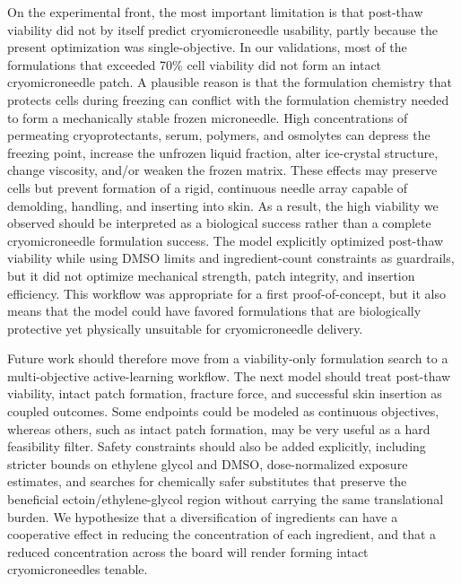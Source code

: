 \documentclass[11pt]{article}
\begin{document}
On the experimental front, the most important limitation is that post-thaw viability did not by itself predict cryomicroneedle usability, partly because the present optimization was single-objective. In our validations, most of the formulations that exceeded 70\% cell viability did not form an intact cryomicroneedle patch. A plausible reason is that the formulation chemistry that protects cells during freezing can conflict with the formulation chemistry needed to form a mechanically stable frozen microneedle. High concentrations of permeating cryoprotectants, serum, polymers, and osmolytes can depress the freezing point, increase the unfrozen liquid fraction, alter ice-crystal structure, change viscosity, and/or weaken the frozen matrix. These effects may preserve cells but prevent formation of a rigid, continuous needle array capable of demolding, handling, and inserting into skin. As a result, the high viability we observed should be interpreted as a biological success rather than a complete cryomicroneedle formulation success. The model explicitly optimized post-thaw viability while using DMSO limits and ingredient-count constraints as guardrails, but it did not optimize mechanical strength, patch integrity, and insertion efficiency. This workflow was appropriate for a first proof-of-concept, but it also means that the model could have favored formulations that are biologically protective yet physically unsuitable for cryomicroneedle delivery.\cite{whaley_overview_2021,murray_chemical_2022,chang_cryomicroneedles_2021}

Future work should therefore move from a viability-only formulation search to a multi-objective active-learning workflow. The next model should treat post-thaw viability, intact patch formation, fracture force, and successful skin insertion as coupled outcomes.\cite{shahriari_human_2016,tom_self_driving_2024} Some endpoints could be modeled as continuous objectives, whereas others, such as intact patch formation, may be very useful as a hard feasibility filter. Safety constraints should also be added explicitly, including stricter bounds on ethylene glycol and DMSO, dose-normalized exposure estimates, and searches for chemically safer substitutes that preserve the beneficial ectoin/ethylene-glycol region without carrying the same translational burden.\cite{murray_chemical_2022} We hypothesize that a diversification of ingredients can have a cooperative effect in reducing the concentration of each ingredient, and that a reduced concentration across the board will render forming intact cryomicroneedles tenable.
\newpage


\end{document}
